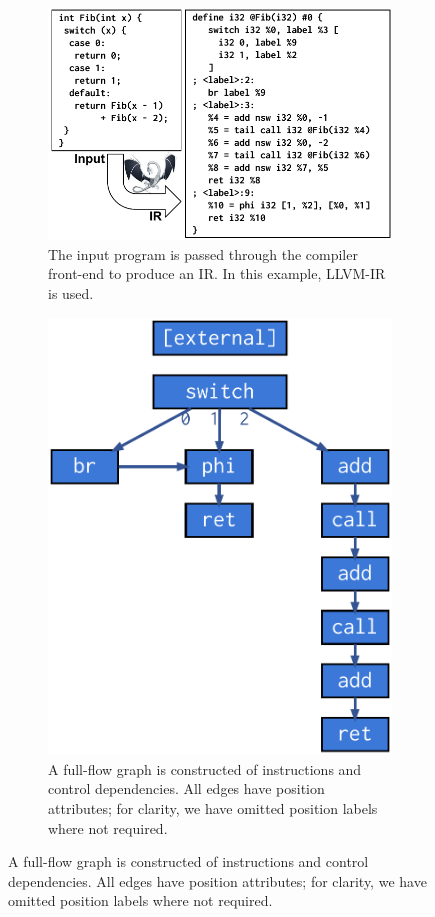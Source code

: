\begin{figure}[t]
  \centering %
  \begin{subfigure}[t]{.46\linewidth}%
  	\centering
  	\includegraphics[width=.95\linewidth]{images/A_IR}%
    \captionsetup{width=.95\linewidth}%
  	\caption{%
      The input program is passed through the compiler front-end to produce an
      IR. In this example, LLVM-IR is used.%
    }
  	\label{subfigure:ir}%
  \end{subfigure}
  \quad
	\begin{subfigure}[t]{.46\linewidth}%
		\centering
  	\includegraphics[width=.51\linewidth]{images/B_Control}%
    \captionsetup{width=.95\linewidth}%
  	\caption{%
      A full-flow graph is constructed of instructions and control dependencies.
      All edges have position attributes; for clarity, we have omitted position
      labels where not required.%
    }
  	\label{subfigure:control_flow}%
	\end{subfigure}

\end{figure}
